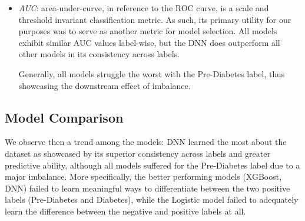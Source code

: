 \documentclass[conference]{IEEEtran}
\begin{document}
\begin{itemize}
            \item \textit{AUC}: area-under-curve, in reference to the ROC curve, is a scale and threshold invariant classification metric. As such, its primary utility for our purposes was to serve as another metric for  model selection. All models exhibit similar AUC values label-wise, but the DNN does outperform all other models in its consistency across labels.

            Generally, all models struggle the worst with the Pre-Diabetes label, thus showcasing the downstream effect of imbalance.
        \end{itemize}

    \subsection{Model Comparison}
    We observe then a trend among the models: DNN learned the most about the dataset as showcased by its superior consistency across labels and greater predictive ability, although all models suffered for the Pre-Diabetes label due to a major imbalance. More specifically, the better performing models (XGBoost, DNN) failed to learn meaningful ways to differentiate between the two positive labels (Pre-Diabetes and Diabetes), while the Logistic model failed to adequately learn the difference between the negative and positive labels at all.
\end{document}
